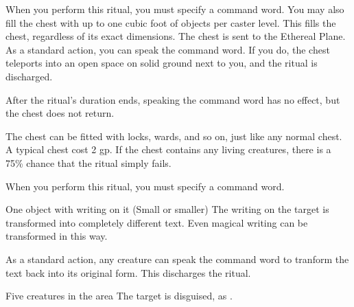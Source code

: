 \spellspecial When you perform this ritual, you must specify a command word. You may also fill the chest with up to one cubic foot of objects per caster level. This fills the chest, regardless of its exact dimensions.
\spellline
\spelleffect The chest is sent to the Ethereal Plane. As a standard action, you can speak the command word. If you do, the chest teleports into an open space on solid ground next to you, and the ritual is discharged.

After the ritual's duration ends, speaking the command word has no effect, but the chest does not return.

\spellnotes The chest can be fitted with locks, wards, and so on, just like any normal chest. A typical chest cost 2 gp. If the chest contains any living creatures, there is a 75\% chance that the ritual simply fails.

\spellspecial When you perform this ritual, you must specify a command word.
\spellline
\begin{spelltarget}{One object with writing on it (Small or smaller)}
    \spelleffect The writing on the target is transformed into completely different text. Even magical writing can be transformed in this way.

    As a standard action, any creature can speak the command word to tranform the text back into its original form. This discharges the ritual.
\end{spelltarget}

\spelldur{\durlong \dismissable}
\begin{spelltarget}{Five creatures in the area}
    \spelleffect The target is disguised, as .
\end{spelltarget}

